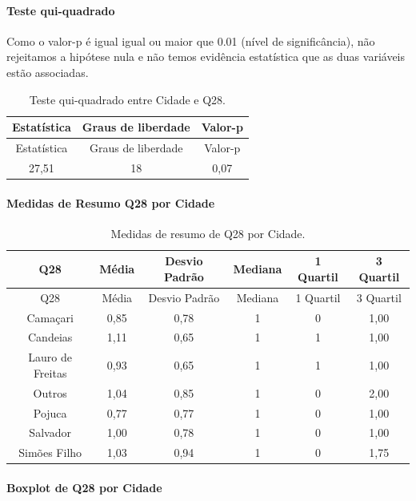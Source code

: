 \documentclass[]{article}
\let\oldparagraph\paragraph
\renewcommand{\paragraph}[1]{\oldparagraph{#1}\mbox{}}
\begin{document}
\hypertarget{teste-qui-quadrado-72}{%
\paragraph{Teste qui-quadrado}\label{teste-qui-quadrado-72}}

Como o valor-p é igual igual ou maior que 0.01 (nível de significância), não rejeitamos a hipótese nula e não temos evidência estatística que as duas variáveis estão associadas.

\begin{longtable}[]{@{}ccc@{}}
\caption{\label{tab:unnamed-chunk-841}Teste qui-quadrado entre Cidade e Q28.}\tabularnewline
\toprule
Estatística & Graus de liberdade & Valor-p\tabularnewline
\midrule
\endfirsthead
\toprule
Estatística & Graus de liberdade & Valor-p\tabularnewline
\midrule
\endhead
27,51 & 18 & 0,07\tabularnewline
\bottomrule
\end{longtable}

\cleardoublepage

\hypertarget{medidas-de-resumo-q28-por-cidade}{%
\paragraph{Medidas de Resumo Q28 por Cidade}\label{medidas-de-resumo-q28-por-cidade}}

\begin{longtable}[]{@{}cccccc@{}}
\caption{\label{tab:unnamed-chunk-842}Medidas de resumo de Q28 por Cidade.}\tabularnewline
\toprule
Q28 & Média & Desvio Padrão & Mediana & 1 Quartil & 3 Quartil\tabularnewline
\midrule
\endfirsthead
\toprule
Q28 & Média & Desvio Padrão & Mediana & 1 Quartil & 3 Quartil\tabularnewline
\midrule
\endhead
Camaçari & 0,85 & 0,78 & 1 & 0 & 1,00\tabularnewline
Candeias & 1,11 & 0,65 & 1 & 1 & 1,00\tabularnewline
Lauro de Freitas & 0,93 & 0,65 & 1 & 1 & 1,00\tabularnewline
Outros & 1,04 & 0,85 & 1 & 0 & 2,00\tabularnewline
Pojuca & 0,77 & 0,77 & 1 & 0 & 1,00\tabularnewline
Salvador & 1,00 & 0,78 & 1 & 0 & 1,00\tabularnewline
Simões Filho & 1,03 & 0,94 & 1 & 0 & 1,75\tabularnewline
\bottomrule
\end{longtable}

\hypertarget{boxplot-de-q28-por-cidade}{%
\paragraph{Boxplot de Q28 por Cidade}\label{boxplot-de-q28-por-cidade}}
\end{document}
